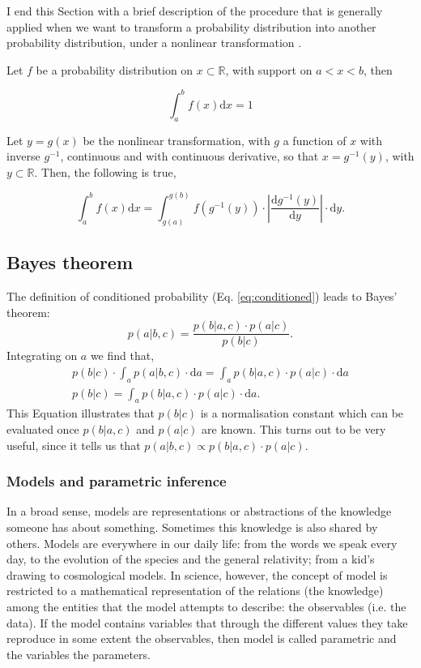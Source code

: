 {\color{red}
I end this Section with a brief description of the procedure that is generally applied when we want to transform a probability distribution into another probability distribution, under a nonlinear transformation \cite[for more details see page 18 and 19 of][]{Bishop2006}. 

Let  $f$ be a probability distribution on $x\subset\mathbb{R}$, with support on $a<x<b$, then

\begin{equation}
\int_a^b f(x) \mathrm{d}x = 1 \nonumber
\end{equation}

Let $y=g(x)$ be the nonlinear transformation, with $g$ a function of $x$ with inverse $g^{-1}$, continuous and with continuous derivative, so that $x=g^{-1}(y)$, with $y\subset \mathbb{R}$. Then, the following is true,

\begin{equation}
\label{eq:transformdistribution}
\int_a^b f(x) \mathrm{d}x = \int_{g(a)}^{g(b)} f(g^{-1}(y))\cdot \left|\frac{\mathrm{d}g^{-1}(y)}{\mathrm{d}y}\right|\cdot \mathrm{d}y.
\end{equation}
}
\subsection{Bayes theorem}
The definition of conditioned probability (Eq. \ref{eq:conditioned}) leads to Bayes' theorem:
\begin{equation}
p(a|b,c) = \frac{p(b|a,c)\cdot p(a|c)}{p(b|c)}.
\end{equation}
Integrating on $a$ we find that,
\begin{align}
\label{eq:evidence}
p(b|c) \cdot \int_a p(a|b,c)\cdot \mathrm{d}a = \int_a p(b|a,c) \cdot p(a|c) \cdot \mathrm{d}a \nonumber \\
p(b|c) = \int_a p(b|a,c) \cdot p(a|c) \cdot \mathrm{d}a.
\end{align}
This Equation illustrates that $p(b|c)$ is a normalisation constant which can be evaluated once $p(b|a,c)$ and $p(a|c)$ are known. This turns out to be very useful, since it tells us that $p(a|b,c) \propto p(b|a,c) \cdot p(a|c)$.

\subsubsection{Models and parametric inference}
In a broad sense, models are representations or abstractions of the knowledge someone has about something. Sometimes this knowledge is also shared by others. Models are everywhere in our daily life: from the words we speak every day, to the evolution of the species and the general relativity; from a kid's drawing to cosmological models. In science, however, the concept of model is restricted to a mathematical representation of the relations (the knowledge) among the entities that the model attempts to describe: the observables (i.e. the data). If the model contains variables that through the different values they take reproduce in some extent the observables, then model is called parametric and the variables the parameters. 

